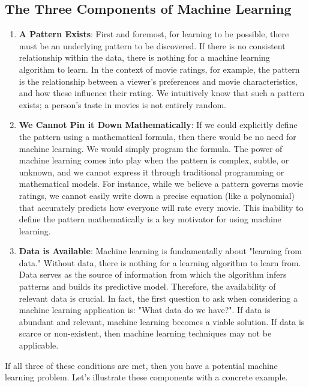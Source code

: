 \documentclass{article}
\begin{document}
\subsection{The Three Components of Machine Learning}

\begin{enumerate}
    \item \textbf{A Pattern Exists}:  First and foremost, for learning to be possible, there must be an underlying pattern to be discovered. If there is no consistent relationship within the data, there is nothing for a machine learning algorithm to learn. In the context of movie ratings, for example, the pattern is the relationship between a viewer's preferences and movie characteristics, and how these influence their rating. We intuitively know that such a pattern exists; a person's taste in movies is not entirely random.

    \item \textbf{We Cannot Pin it Down Mathematically}: If we could explicitly define the pattern using a mathematical formula, then there would be no need for machine learning. We would simply program the formula.  The power of machine learning comes into play when the pattern is complex, subtle, or unknown, and we cannot express it through traditional programming or mathematical models.  For instance, while we believe a pattern governs movie ratings, we cannot easily write down a precise equation (like a polynomial) that accurately predicts how everyone will rate every movie.  This inability to define the pattern mathematically is a key motivator for using machine learning.

    \item \textbf{Data is Available}: Machine learning is fundamentally about "learning from data." Without data, there is nothing for a learning algorithm to learn from. Data serves as the source of information from which the algorithm infers patterns and builds its predictive model.  Therefore, the availability of relevant data is crucial.  In fact, the first question to ask when considering a machine learning application is: "What data do we have?".  If data is abundant and relevant, machine learning becomes a viable solution. If data is scarce or non-existent, then machine learning techniques may not be applicable.
\end{enumerate}

If all three of these conditions are met, then you have a potential machine learning problem.  Let's illustrate these components with a concrete example.
\end{document}
